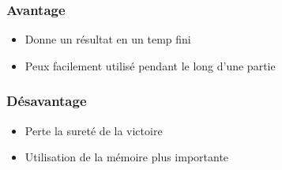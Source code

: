\begin{frame}
  \frametitle{Avantage}
  \begin{itemize}
    \item<2-> Donne un résultat en un temp fini
    \item<3-> Peux facilement utilisé pendant le long d'une partie
  \end{itemize}
\end{frame}

\begin{frame}
  \frametitle{Désavantage}
  \begin{itemize}
    \item<2-> Perte la sureté de la victoire
    \item<3-> Utilisation de la mémoire plus importante
  \end{itemize}
\end{frame}
